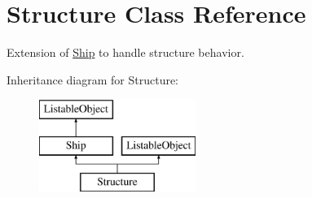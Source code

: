 \hypertarget{class_structure}{}\section{Structure Class Reference}
\label{class_structure}


Extension of \hyperlink{class_ship}{Ship} to handle structure behavior.  


Inheritance diagram for Structure\+:\begin{figure}[H]
\begin{center}
\leavevmode
\includegraphics[height=3.000000cm]{class_structure}
\end{center}
\end{figure}
